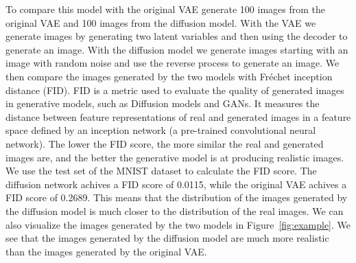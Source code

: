 To compare this model with the original VAE generate 100 images from the original VAE and 100 images from the diffusion model. With the VAE we generate images by generating two latent variables and then using the decoder to generate an image. With the diffusion model we generate images starting with an image with random noise and use the reverse process to generate an image. We then compare the images generated by the two models with Fréchet inception distance (FID). FID is a metric used to evaluate the quality of generated images in generative models, such as Diffusion models and GANs. It measures the distance between feature representations of real and generated images in a feature space defined by an inception network (a pre-trained convolutional neural network). The lower the FID score, the more similar the real and generated images are, and the better the generative model is at producing realistic images. We use the test set of the MNIST dataset to calculate the FID score. The diffusion network achives a FID score of 0.0115, while the original VAE achives a FID score of 0.2689. This means that the distribution of the images generated by the diffusion model is much closer to the distribution of the real images. We can also visualize the images generated by the two models in Figure~\ref{fig:example}. We see that the images generated by the diffusion model are much more realistic than the images generated by the original VAE.
